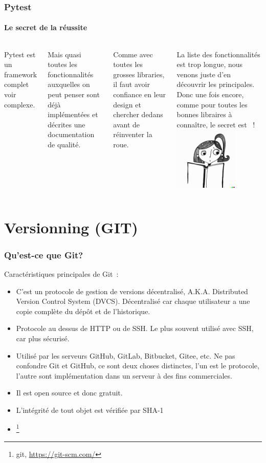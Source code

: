 \documentclass{beamer}
\begin{document}
    \begin{frame}
        \frametitle{Pytest}
        \framesubtitle{Le secret de la réussite}
        \transdissolve
        \begin{columns}
            Pytest est un framework complet voir complexe.

            Mais quasi toutes les fonctionnalités auxquelles on peut penser sont déjà implémentées et décrites une documentation de qualité.

            Comme avec toutes les grosses libraries, il faut avoir confiance en leur design et chercher dedans avant de réinventer la roue.

            La liste des fonctionnalités est trop longue, nous venons juste d'en découvrir les principales.
            \bigbreak
            Donc une fois encore, comme pour toutes les bonnes libraires à connaître, le secret est ~!
            \centering
            \includegraphics[width=3cm]{image/girl-rtfm.png}
        \end{columns}
    \end{frame}


    \section{Versionning (GIT)}

    \begin{frame}
        \frametitle{Qu'est-ce que Git?}
        \transdissolve
        Caractéristiques principales de Git~:
        \begin{itemize}
            \item C'est un protocole de gestion de versions décentralisé, A.K.A. Distributed Version Control System (DVCS).
            Décentralisé car chaque utilisateur a une copie complète du dépôt et de l'historique.
            \item Protocole au dessus de HTTP ou de SSH. Le plus souvent utilisé avec SSH, car plus sécurisé.
            \item Utilisé par les serveurs GitHub, GitLab, Bitbucket, Gitee, etc.
            Ne pas confondre Git et GitHub, ce sont deux choses distinctes, l'un est le protocole, l'autre sont implémentation dans un serveur à des fins commerciales.
            \item Il est open source et donc gratuit.
            \item L'intégrité de tout objet est vérifiée par SHA-1
            \item {}\footnote{git, \url{https://git-scm.com/}} 
        \end{itemize}
    \end{frame}
\end{document}
